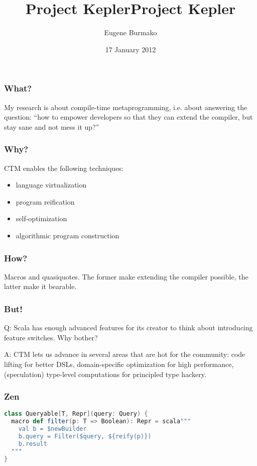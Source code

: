 \documentclass[hyperref={bookmarks=false}]{beamer}
\title{Project Kepler}
\begin{document}
\title{Project Kepler}
\author{Eugene Burmako}
\date{17 January 2012}
\maketitle

\begin{frame}[fragile]
\frametitle{What?}

My research is about compile-time metaprogramming, i.e. about answering the question:
``how to empower developers so that they can extend the compiler, but stay sane and not mess it up?''
\end{frame}

\begin{frame}[fragile]
\frametitle{Why?}

CTM enables the following techniques:
\begin{itemize}
\item language virtualization
\item program reification
\item self-optimization
\item algorithmic program construction
\end{itemize}
\end{frame}

\begin{frame}[fragile]
\frametitle{How?}

Macros and quasiquotes. The former make extending the compiler possible, the latter make it bearable.
\end{frame}

\begin{frame}[fragile]
\frametitle{But!}

Q: Scala has enough advanced features for its creator to think about introducing feature switches.
Why bother?

A: CTM lets us advance in several areas that are hot for the community:
code lifting for better DSLs,
domain-specific optimization for high performance,
(speculation) type-level computations for principled type hackery.
\end{frame}

\begin{frame}[fragile]
\frametitle{Zen}

\begin{lstlisting}[language=scala]
class Queryable[T, Repr](query: Query) {
  macro def filter(p: T => Boolean): Repr = scala"""
    val b = $newBuilder
    b.query = Filter($query, ${reify(p)})
    b.result
  """
}
\end{lstlisting}
\end{frame}
\end{document}

